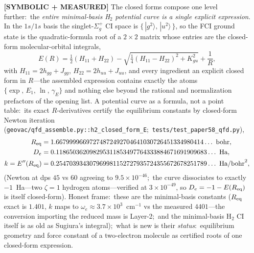 \documentclass[aps,pra,twocolumn,superscriptaddress,longbibliography]{revtex4-2}
\begin{document}
\textbf{[SYMBOLIC + MEASURED]} The closed forms compose one level further:\ the
\emph{entire minimal-basis H$_2$ potential curve is a single explicit
expression}.  In the $1s/1s$ basis the singlet-$\Sigma_g^+$ CI space is
$\{\,|g^2\rangle,\,|u^2\rangle\,\}$, so the FCI ground state is the
quadratic-formula root of a $2\times2$ matrix whose entries are the closed-form
molecular-orbital integrals,
\begin{equation}
E(R)=\tfrac12\!\left(H_{11}+H_{22}\right)
-\sqrt{\tfrac14\!\left(H_{11}-H_{22}\right)^{2}+K_{gu}^{2}}+\frac1R,
\label{eq:h2_pes}
\end{equation}
with $H_{11}=2h_{gg}+J_{gg}$, $H_{22}=2h_{uu}+J_{uu}$, and every ingredient an
explicit closed form in $R$---the assembled expression contains exactly the
atoms $\{\exp,\,E_{1},\,\ln,\,\gamma_{E}\}$ and nothing else beyond the rational and normalization prefactors of the opening list.  A potential
curve as a formula, not a point table:\ its exact $R$-derivatives certify the
equilibrium constants by closed-form Newton iteration
(\texttt{geovac/qfd\_assemble.py::h2\_closed\_form\_E};\
\texttt{tests/test\_paper58\_qfd.py}),
\begin{align*}
R_{\rm eq}&=1.66799996697274872492704641030726451334980414\ldots\ \text{bohr},\\
D_e&=0.118650362098295311853497764333884671691909683\ldots\ \text{Ha},\\
k=E''(R_{\rm eq})&=0.254703934307969981152727935724355672678251789\ldots\ \text{Ha/bohr}^2,
\end{align*}
(Newton at dps $45$ vs $60$ agreeing to $9.5\times10^{-46}$;\ the curve
dissociates to exactly $-1$~Ha---two $\zeta{=}1$ hydrogen atoms---verified at
$3\times10^{-49}$, so $D_e=-1-E(R_{\rm eq})$ is itself closed-form).  Honest
frame:\ these are the minimal-basis constants ($R_{\rm eq}$ exact is $1.401$,
$k$ maps to $\omega_e\approx3.7\times10^{3}$~cm$^{-1}$ vs the measured
$4401$---the conversion importing the reduced mass is Layer-2;\ and the
minimal-basis H$_2$ CI itself is as old as Sugiura's integral);\ what is new is
their \emph{status}:\ equilibrium geometry and force constant of a two-electron
molecule as certified roots of one closed-form expression.
\end{document}
